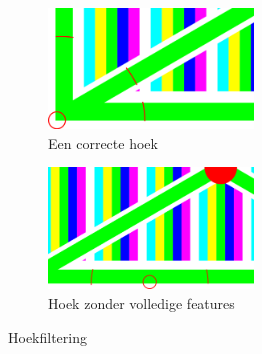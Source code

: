 \begin{figure}[H] 
\centering
\begin{subfigure}{0.5\textwidth}
\centering
\includegraphics[width=0.6\textwidth]{img/correctCorner.png}
\caption{Een correcte hoek}
\label{fig:correcte hoek}
\end{subfigure}%
\begin{subfigure}{0.5\textwidth}
\centering
\includegraphics[width=0.6\textwidth]{img/notACorner.png}
\caption{Hoek zonder volledige features}
\label{fig:foute hoek}
\end{subfigure}
\caption{Hoekfiltering}
\end{figure}
